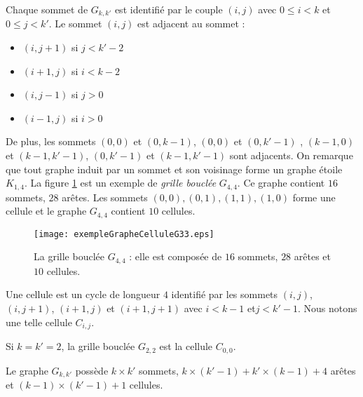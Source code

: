 Chaque sommet de $G_{k,k'}$ est identifi\'e par le couple $(i,j)$ avec $0 \le i < k$ et $0 \le j < k'$. Le sommet $(i,j)$ est adjacent  au sommet :
\begin{itemize}
	\item $(i, j+1)$ si $j < k'-2$
	\item $(i+1,j)$ si $i < k-2$
	\item $(i,j-1)$ si $j > 0$
	\item $(i-1,j)$ si $i > 0$
\end{itemize}
De plus, les sommets  $(0,0)$ et $(0,k-1)$,  $(0,0)$ et $(0,k'-1)$ , $(k-1,0)$ et $(k-1,k'-1)$, $(0,k'-1)$ et $(k-1,k'-1)$ sont adjacents.
On remarque que tout graphe  induit par un sommet et son voisinage forme un graphe \'etoile $K_{1,4}$.
La figure \ref{exempleGrapheCellule} est un exemple de {\em grille boucl\'ee} $G_{4,4}$. Ce graphe contient $16$ sommets, $28$ ar\^etes. Les sommets $(0,0), (0,1), (1,1), (1,0)$ forme une cellule et le graphe $G_{4,4}$ contient  $10$ cellules. 
\begin{figure}[htb!] 
\centering
\texttt{[image: exempleGrapheCelluleG33.eps]}
\caption{ La grille boucl\'ee $G_{4,4}$ : elle est compos\'ee de $16$ sommets, $28$ ar\^etes et $10$ cellules. }
\label{exempleGrapheCellule} 
\end{figure}
\begin{definition}
Une cellule est un cycle de longueur $4$ identifi\'e par les sommets $(i,j)$, $(i,j+1)$, $(i+1,j)$ et $(i+1,j+1)$ avec $i<k-1$ et$j<k'-1$. Nous notons une telle cellule $C_{i,j}$.
\end{definition}
Si $k = k' = 2$, la grille boucl\'ee $G_{2,2}$ est la cellule $C_{0,0}$.

\begin{property}
Le graphe $G_{k,k'}$ poss\`ede $k \times k'$ sommets,  $k \times (k'-1) + k' \times(k-1) + 4$  ar\^etes et $(k-1) \times (k'-1) +1$ cellules.
\end{property}




